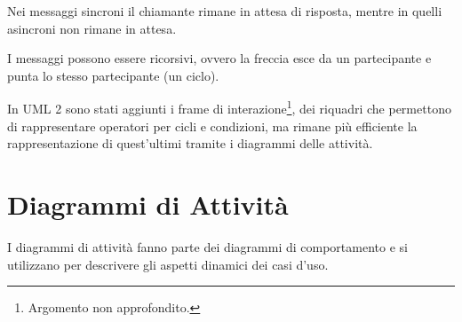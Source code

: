 Nei messaggi sincroni il chiamante rimane in attesa di risposta, mentre in quelli asincroni non rimane in attesa.

I messaggi possono essere ricorsivi, ovvero la freccia esce da un partecipante e punta lo stesso partecipante (un ciclo).

In UML 2 sono stati aggiunti i frame di interazione\footnote{Argomento non approfondito.}, dei riquadri che permettono di rappresentare operatori per cicli e condizioni, ma rimane più efficiente la rappresentazione di quest'ultimi tramite i diagrammi delle attività. 

\section{Diagrammi di Attività}
I diagrammi di attività fanno parte dei diagrammi di comportamento e si utilizzano per descrivere gli aspetti dinamici dei casi d'uso. 


